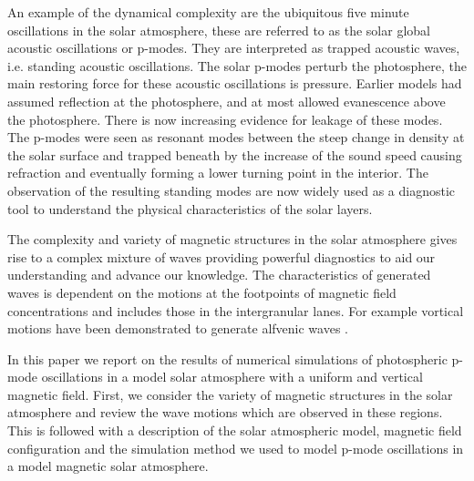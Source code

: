 \documentclass[twocolumn]{aastex62}
\begin{document}
An example of the dynamical complexity are the ubiquitous five minute oscillations in the solar atmosphere, these are referred to as the solar global acoustic oscillations or p-modes. They are interpreted as trapped acoustic waves, i.e. standing acoustic oscillations. The solar p-modes perturb the photosphere, the main restoring force for these acoustic oscillations is pressure.  Earlier models had assumed reflection at the photosphere, and at most allowed evanescence above the photosphere. There is now increasing evidence for leakage of these modes. The p-modes were seen as resonant modes between the steep change in density at the solar surface and trapped beneath by the increase of the sound speed causing refraction and eventually forming a lower turning point in the interior. The observation of the resulting standing modes are now widely used as a diagnostic tool to understand the physical characteristics of the solar layers.

The complexity and variety of magnetic structures in the solar atmosphere gives rise to a complex mixture of waves providing powerful diagnostics to aid our understanding and advance our knowledge. The characteristics of generated waves is dependent on the motions at the footpoints of magnetic field concentrations and includes those in the intergranular lanes. For example vortical motions have been demonstrated to generate alfvenic waves \citet{Fedun2011}. 

In this paper we report on the results of numerical simulations of photospheric p-mode oscillations in a model solar atmosphere with a uniform and vertical magnetic field. First, we consider the variety of magnetic structures in the solar atmosphere and review the wave motions which are observed in these regions. This is followed with a description of the solar atmospheric model, magnetic field configuration and the simulation method we used to model p-mode oscillations in a model magnetic solar atmosphere.
\end{document}
